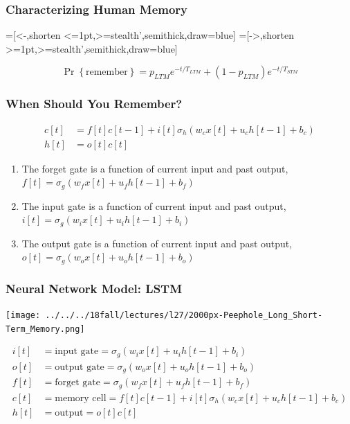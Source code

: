 \documentclass{beamer}
\begin{document}
\begin{frame}
  \frametitle{Characterizing Human Memory}
  \begin{center}
    =[<-,shorten <=1pt,>=stealth',semithick,draw=blue]
    =[->,shorten >=1pt,>=stealth',semithick,draw=blue]
  \end{center}
  \[
  \Pr\left\{\mbox{remember}\right\}=p_{LTM} e^{-t/T_{LTM}}+ (1-p_{LTM})e^{-t/T_{STM}}
  \]
\end{frame}

\begin{frame}
  \frametitle{When Should You Remember?}
  \begin{align*}
    c[t] &= f[t]c[t-1] + i[t]\sigma_h\left(w_cx[t]+u_ch[t-1]+b_c\right)\\
    h[t] &= o[t]c[t]
  \end{align*}
  \begin{enumerate}
  \item The forget gate is a function of current input and past output,
    $f[t] = \sigma_g\left(w_fx[t]+u_fh[t-1]+b_f\right)$
  \item The input gate is a function of current input and past output,
    $i[t] = \sigma_g\left(w_ix[t]+u_ih[t-1]+b_i\right)$
  \item The output gate is a function of current input and past output,
    $o[t] = \sigma_g\left(w_ox[t]+u_oh[t-1]+b_o\right)$
  \end{enumerate}
\end{frame}
  
\begin{frame}
  \frametitle{Neural Network Model: LSTM}
  \centerline{\texttt{[image: ../../../18fall/lectures/l27/2000px-Peephole\_Long\_Short-Term\_Memory.png]}}
  \begin{align*}
    i[t] &=\mbox{input gate}=\sigma_g(w_i x[t]+u_i h[t-1]+b_i)\\
    o[t] &=\mbox{output gate}=\sigma_g(w_o x[t]+u_o h[t-1]+b_o)\\
    f[t] &=\mbox{forget gate}=\sigma_g(w_f x[t]+u_f h[t-1]+b_f)\\
    c[t] &=\mbox{memory cell}=f[t]c[t-1]+i[t]\sigma_h\left(w_cx[t]+u_ch[t-1]+b_c\right)\\
    h[t] &=\mbox{output}=o[t]c[t]
  \end{align*}
\end{frame}
\end{document}
